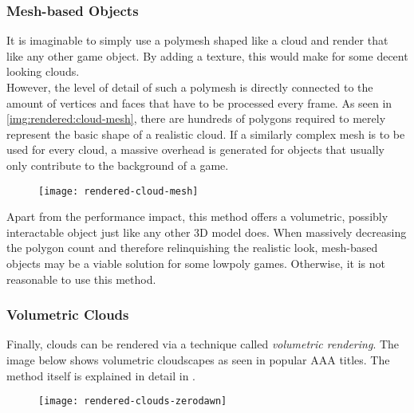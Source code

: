 \subsubsection{Mesh-based Objects}
It is imaginable to simply use a \gls{polymesh} shaped like a cloud and render that like any other game object. By adding a texture, this would make for some decent looking clouds.
\\
However, the level of detail of such a polymesh is directly connected to the amount of vertices and faces that have to be processed every frame.
As seen in \autoref{img:rendered:cloud-mesh}, there are hundreds of polygons required to merely represent the basic shape of a realistic cloud.
If a similarly complex mesh is to be used for every cloud, a massive overhead is generated for objects that usually only contribute to the background of a game.
\begin{figure}[H]
    \centering
    \texttt{[image: rendered-cloud-mesh]}
    \label{img:rendered:cloud-mesh}
\end{figure}
\noindent
Apart from the performance impact, this method offers a volumetric, possibly interactable object just like any other 3D model does.
When massively decreasing the polygon count and therefore relinquishing the realistic look, mesh-based objects may be a viable solution for some \gls{lowpoly} games.
Otherwise, it is not reasonable to use this method.

\subsubsection{Volumetric Clouds}
Finally, clouds can be rendered via a technique called \textit{volumetric rendering}. The image below shows volumetric cloudscapes as seen in popular AAA titles.
The method itself is explained in detail in .

\begin{figure}[H]
    \centering
    \texttt{[image: rendered-clouds-zerodawn]}
    \label{img:rendered:clouds-zerodawn}
\end{figure}